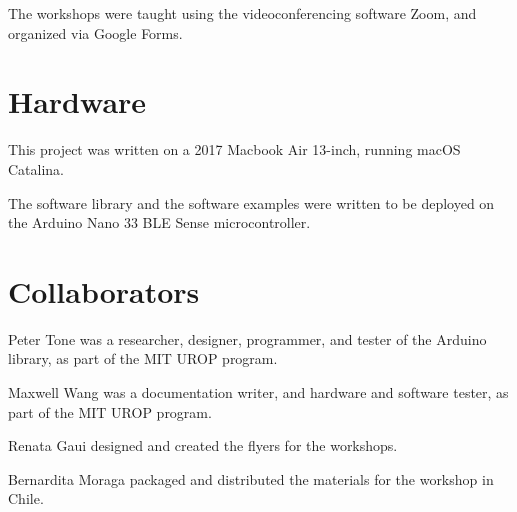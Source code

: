 The workshops were taught using the videoconferencing software Zoom, and organized via Google Forms.

\section{Hardware}

This project was written on a 2017 Macbook Air 13-inch, running macOS Catalina.

The software library and the software examples were written to be deployed on the Arduino Nano 33 BLE Sense microcontroller.

\section{Collaborators}

Peter Tone was a researcher, designer, programmer, and tester of the Arduino library, as part of the MIT UROP program.

Maxwell Wang was a documentation writer, and hardware and software tester, as part of the MIT UROP program.

Renata Gaui designed and created the flyers for the workshops.

Bernardita Moraga packaged and distributed the materials for the workshop in Chile.

\newpage
